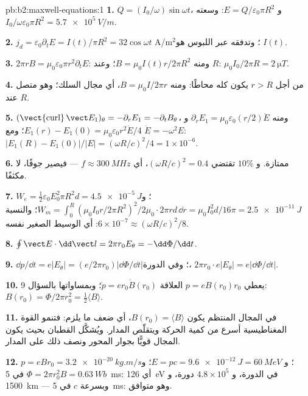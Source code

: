\begin{solution}{pb:b2:maxwell-equations:1}
\textbf{1.} $Q = (I_0/\omega)\sin\omega t$، و $E = Q/\varepsilon_0\pi R^2$: وسعته $I_0/\omega\varepsilon_0
\pi R^2 = \qty{5.7e5}{V/m}$.

\textbf{2.} $j_d = \varepsilon_0\partial_tE = I(t)/\pi R^2 = 32\cos\omega t$ A/m$^2$؛ وتدفقه
عبر اللبوس هو $I(t)$.

\textbf{3.} $2\pi rB = \mu_0\varepsilon_0\pi r^2\partial_tE$: ومنه $B = \mu_0I(t)r/2\pi R^2$؛ وعند $R$:
$\mu_0I_0/2\pi R = \qty{2}{\micro T}$.

\textbf{4.} من أجل $r > R$ يكون  كله محاطًا: ومنه $B =
\mu_0I/2\pi r$، أي مجال السلك؛ وهو متصل عند $R$.

\textbf{5.} $(\operatorname{\vect{curl}}\vect E_1)_\theta = -\partial_rE_1 = -\partial_tB_\theta$، ومنه $\partial_rE_1
= \mu_0\varepsilon_0(r/2)\ddot E$ و $E_1(r) - E_1(0) = \mu_0\varepsilon_0r^2\ddot E/4$؛ ومع
$\ddot E = -\omega^2E$: $|E_1(R) - E_1(0)|/|E| = (\omega R/c)^2/4 = 1 \times 10^{-6}$.

\textbf{6.} ممتازة. و $10\%$ تقتضي $(\omega R/c)^2 = 0.4$، أي $f \approx \qty{300}{MHz}$ ---
فيصير جوفًا، لا مكثفًا.

\textbf{7.} $W_e = \tfrac12\varepsilon_0E_0^2\pi R^2d = \qty{4.5e-5}{J}$؛ و $W_m = \int_0^R(\mu_0I_0r/
2\pi R^2)^2/2\mu_0\cdot2\pi rd\,\dd r = \mu_0I_0^2d/16\pi = \qty{2.5e-11}{J}$؛ والنسبة $6 \times
10^{-7} \approx (\omega R/c)^2/8$: أي الوسيط الصغير نفسه.

\textbf{8.} $\oint\vect E\cdot\dd\vect l = 2\pi r_0E_\theta = -\dd\Phi/\dd t$.

\textbf{9.} $\dd p/\dd t = e|E_\theta| = (e/2\pi r_0)|\dd\Phi/\dd t|$؛ وفي الدورة،
$2\pi r_0\cdot e|E_\theta| = e|\dd\Phi/\dd t|$.

\textbf{10.} يعطي $p = eB(r_0)r_0$ العلاقة $\dot p = er_0\dot B(r_0)$؛ وبمساواتها بالسؤال 9:
$B(r_0) = \Phi/2\pi r_0^2 = \tfrac12\langle B\rangle$.

\textbf{11.} في المجال المنتظم يكون $B(r_0) = \langle B\rangle$، أي ضعف ما يلزم:
فتنمو القوة المغناطيسية أسرع من كمية الحركة ويتقلّص
المدار. ويُشكَّل القطبان بحيث يكون المجال قويًّا بجوار
المحور ونصف ذلك على المدار.

\textbf{12.} $p = eBr_0 = \qty{3.2e-20}{kg.m/s}$؛ و $E = pc = \qty{9.6e-12}{J} = \qty{60}{MeV}$؛
و $\Phi = 2\pi r_0^2B = \qty{0.63}{Wb}$ في \qty{5}{ms}: أي \qty{126}{eV} في الدورة، و $4.8 \times
10^5$ دورة، و \qty{1500}{km} --- وبسرعة $c$ في \qty{5}{ms}: وهو متوافق.


\end{solution}
